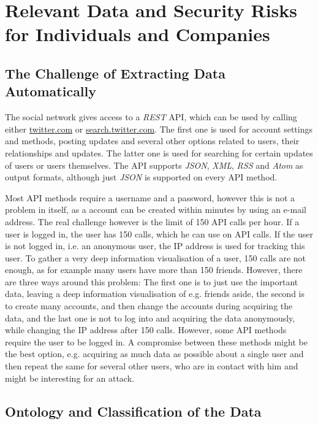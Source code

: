 \section{Relevant Data and Security Risks for Individuals and Companies}
\label{sec:relevant_data}

\subsection{The Challenge of Extracting Data Automatically}

The \Twitter{} social network gives access to a \textit{REST} API, which can be
used by calling either \url{twitter.com} or \url{search.twitter.com}. The first
one is used for account settings and methods, posting updates and several other
options related to users, their relationships and updates. The latter one is used
for searching for certain updates of users or users themselves. The API
supports \textit{JSON}, \textit{XML}, \textit{RSS} and \textit{Atom} as output
formats, although just \textit{JSON} is supported on every API method.

Most API methods require a username and a password, however this is not a
problem in itself, as a \Twitter{} account can be created within minutes by
using an e-mail address. The real challenge however is the limit of 150 API
calls per hour. If a user is logged in, the user has 150 calls, which he can
use on API calls. If the user is not logged in, i.e. an anonymous user, the IP
address is used for tracking this user. To gather a very deep information
visualisation of a user, 150 calls are not enough, as for example many users
have more than 150 friends. However, there are three ways around this problem:
The first one is to just use the important data, leaving a deep information
visualisation of e.g. friends aside, the second is to create many accounts, and
then change the accounts during acquiring the data, and the last one is not to log
into \Twitter{} and acquiring the data anonymously, while changing the IP
address after 150 calls. However, some API methods require the user to be
logged in. A compromise between these methods might be the best option,
e.g. acquiring as much data as possible about a single user and then repeat the
same for several other users, who are in contact with him and might be
interesting for an attack.

\subsection{Ontology and Classification of the Data}
\label{ssec:ontology}

